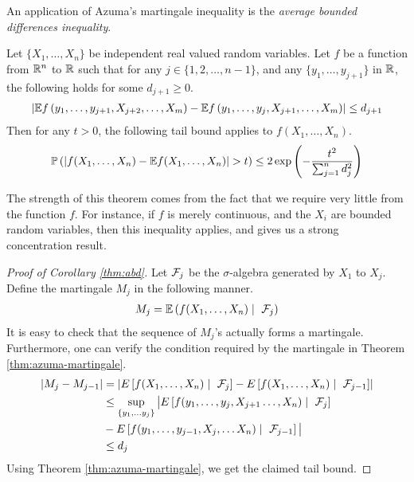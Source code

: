 \documentclass[11pt]{article}
\begin{document}
An application of Azuma's martingale inequality is the \emph{average bounded differences inequality}.

\begin{corollary}
  \label{thm:abd}
  Let $\{X_1, \ldots, X_n\}$ be independent real valued random variables.
  Let $f$ be a function from $\mathbb{R}^n$ to $\mathbb{R}$ such that for any $j \in \{1, 2, \ldots, n-1\}$, and any $\{y_1, \ldots, y_{j+1}\}$ in $\mathbb{R}$, the following holds for some $d_{j+1} \geq 0$.
  \begin{align*}
    \left| \mathbb{E} f\left( y_1, \ldots, y_{j+1}, X_{j+2}, \ldots, X_m \right) -
    \mathbb{E} f\left( y_1, \ldots, y_j, X_{j+1}, \ldots, X_m \right)
    \right| \leq d_{j+1}
  \end{align*}
  Then for any $t > 0$, the following tail bound applies to $f(X_1, \ldots, X_n)$.
  \begin{align*}
    \mathbb{P}\left( \left| f(X_1, \ldots, X_n) - \mathbb{E} f(X_1, \ldots, X_n) \right| > t \right)
    \leq 2 \exp\left( - \frac{t^2}{\sum_{j=1}^n d_j^2} \right)
  \end{align*}
\end{corollary}

\begin{remark}
  The strength of this theorem comes from the fact that we require very little from the function $f$.
  For instance, if $f$ is merely continuous, and the $X_i$ are bounded random variables, then this inequality applies, and gives us a strong concentration result.
\end{remark}

\begin{proof}[Proof of Corollary \ref{thm:abd}]
  Let $\mathcal{F}_j$ be the $\sigma$-algebra generated by $X_1$ to $X_j$.
  Define the martingale $M_j$ in the following manner.
  \begin{align*}
    M_j = \mathbb{E}\left( f(X_1, \ldots, X_n) \mid\ \mathcal{F}_j \right)
  \end{align*}
  It is easy to check that the sequence of $M_j$'s actually forms a martingale.
  Furthermore, one can verify the condition required by the martingale in Theorem \ref{thm:azuma-martingale}.
  \begin{align*}
    \left| M_j - M_{j-1} \right|
    &= \left| E\left[ f(X_1, \ldots, X_n) \mid\ \cF_j \right] - E\left[ f(X_1, \ldots, X_n) \mid\ \cF_{j-1} \right] \right| \\
    &\leq \sup_{\left\{ y_1, \ldots y_j \right\}} \big| E\left[ f(y_1, \ldots, y_j, X_{j+1} \ldots, X_n) \mid\ \cF_j \right] \\
    &- E\left[ f(y_1, \ldots, y_{j-1}, X_j, \ldots X_n) \mid\ \cF_{j-1} \right] \big| \\
    &\leq d_j
  \end{align*}
  Using Theorem \ref{thm:azuma-martingale}, we get the claimed tail bound.
\end{proof}
\end{document}
